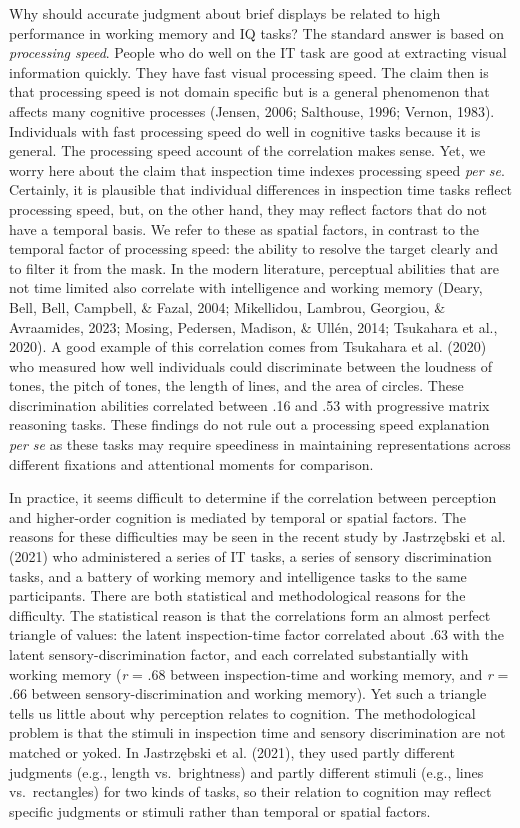 \documentclass[
  ,man]{apa6}
\begin{document}
Why should accurate judgment about brief displays be related to high performance in working memory and IQ tasks? The standard answer is based on \emph{processing speed}. People who do well on the IT task are good at extracting visual information quickly. They have fast visual processing speed. The claim then is that processing speed is not domain specific but is a general phenomenon that affects many cognitive processes (Jensen, 2006; Salthouse, 1996; Vernon, 1983). Individuals with fast processing speed do well in cognitive tasks because it is general. The processing speed account of the correlation makes sense. Yet, we worry here about the claim that inspection time indexes processing speed \emph{per se}. Certainly, it is plausible that individual differences in inspection time tasks reflect processing speed, but, on the other hand, they may reflect factors that do not have a temporal basis. We refer to these as spatial factors, in contrast to the temporal factor of processing speed: the ability to resolve the target clearly and to filter it from the mask. In the modern literature, perceptual abilities that are not time limited also correlate with intelligence and working memory (Deary, Bell, Bell, Campbell, \& Fazal, 2004; Mikellidou, Lambrou, Georgiou, \& Avraamides, 2023; Mosing, Pedersen, Madison, \& Ullén, 2014; Tsukahara et al., 2020). A good example of this correlation comes from Tsukahara et al. (2020) who measured how well individuals could discriminate between the loudness of tones, the pitch of tones, the length of lines, and the area of circles. These discrimination abilities correlated between .16 and .53 with progressive matrix reasoning tasks. These findings do not rule out a processing speed explanation \emph{per se} as these tasks may require speediness in maintaining representations across different fixations and attentional moments for comparison.

In practice, it seems difficult to determine if the correlation between perception and higher-order cognition is mediated by temporal or spatial factors. The reasons for these difficulties may be seen in the recent study by Jastrzębski et al. (2021) who administered a series of IT tasks, a series of sensory discrimination tasks, and a battery of working memory and intelligence tasks to the same participants. There are both statistical and methodological reasons for the difficulty. The statistical reason is that the correlations form an almost perfect triangle of values: the latent inspection-time factor correlated about \(.63\) with the latent sensory-discrimination factor, and each correlated substantially with working memory (\emph{r} = \(.68\) between inspection-time and working memory, and \emph{r} = \(.66\) between sensory-discrimination and working memory). Yet such a triangle tells us little about why perception relates to cognition. The methodological problem is that the stimuli in inspection time and sensory discrimination are not matched or yoked. In Jastrzębski et al. (2021), they used partly different judgments (e.g., length vs.~brightness) and partly different stimuli (e.g., lines vs.~rectangles) for two kinds of tasks, so their relation to cognition may reflect specific judgments or stimuli rather than temporal or spatial factors.
\end{document}
